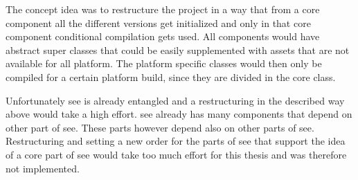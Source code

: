 The concept idea was to restructure the project in a way that from a core component all the different versions get initialized and only in that core component conditional compilation gets used.
All components would have abstract super classes that could be easily supplemented with assets that are not available for all platform.
The platform specific classes would then only be compiled for a certain platform build, since they are divided in the core class.

Unfortunately \gls{see} is already entangled and a restructuring in the described way above would take a high effort.
\gls{see} already has many components that depend on other part of \gls{see}. 
These parts however depend also on other parts of \gls{see}. 
Restructuring and setting a new order for the parts of see that support the idea of a core part of \gls{see} would take too much effort for this thesis and was therefore not implemented.